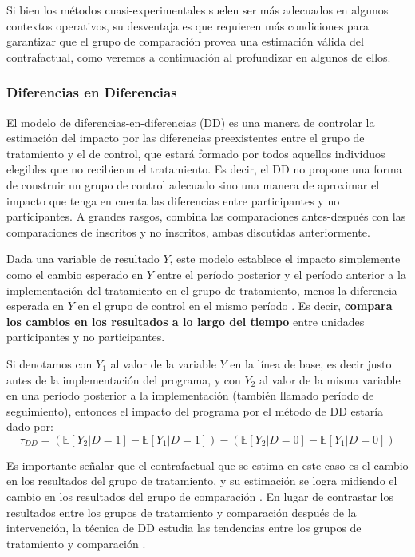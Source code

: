 \documentclass[../../main.tex]{subfiles}
\begin{document}
Si bien los métodos cuasi-experimentales suelen ser más adecuados en algunos contextos
operativos, su desventaja es que requieren más condiciones para garantizar que el grupo de
comparación provea una estimación válida del contrafactual, como veremos a continuación al
profundizar en algunos de ellos.

\subsubsection{Diferencias en Diferencias}
El modelo de diferencias-en-diferencias (DD) es una manera de controlar la estimación del
impacto por las diferencias preexistentes entre el grupo de tratamiento y el de control,
que estará formado por todos aquellos individuos elegibles que no recibieron el
tratamiento. Es decir, el DD no propone una forma de construir un grupo de control
adecuado sino una manera de aproximar el impacto que tenga en cuenta las diferencias entre
participantes y no participantes. A grandes rasgos, combina las comparaciones
antes-después con las comparaciones de inscritos y no inscritos, ambas discutidas
anteriormente.

Dada una variable de resultado \(Y\), este modelo establece el impacto simplemente como el
cambio esperado en \(Y\) entre el período posterior y el período anterior a la
implementación del tratamiento en el grupo de tratamiento, menos la diferencia esperada en
\(Y\) en el grupo de control en el mismo período \cite{bernal}. Es decir, \textbf{compara
los cambios en los resultados a lo largo del tiempo} entre unidades participantes y no
participantes.

Si denotamos con \(Y_1\) al valor de la variable \(Y\) en la línea de base, es decir justo
antes de la implementación del programa, y con \(Y_2\) al valor de la misma variable en
una período posterior a la implementación (también llamado período de seguimiento),
entonces el impacto del programa por el método de DD estaría dado por:
\begin{equation}
    \tau_{DD} =
        \left(
            \mathbb{E}\left[Y_2|D=1\right] - \mathbb{E}\left[Y_1|D=1\right]
        \right) -
        \left(
            \mathbb{E}\left[Y_2|D=0\right] - \mathbb{E}\left[Y_1|D=0\right]
        \right)
        \label{eq:dif-en-dif-1}
\end{equation}

Es importante señalar que el contrafactual que se estima en este caso es el cambio en los
resultados del grupo de tratamiento, y su estimación se logra midiendo el cambio en los
resultados del grupo de comparación \cite{gertler-2016}. En lugar de contrastar los
resultados entre los grupos de tratamiento y comparación después de la intervención, la
técnica de DD estudia las tendencias entre los grupos de tratamiento y comparación
\cite{gertler-2016}.
\end{document}

